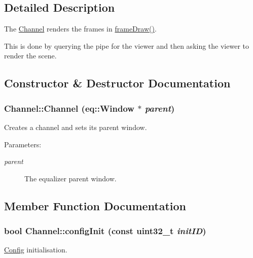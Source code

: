 \subsection{Detailed Description}
The \hyperlink{a00002}{Channel} renders the frames in \hyperlink{a00002_70cfd22742da9b9aa3e3478f356ba220}{frameDraw()}. 

This is done by querying the pipe for the viewer and then asking the viewer to render the scene. 

\subsection{Constructor \& Destructor Documentation}
\hypertarget{a00002_332b524bf3dd36fb43ff699fb8b64052}{
\subsubsection[{Channel}]{\setlength{\rightskip}{0pt plus 5cm}Channel::Channel (eq::Window $\ast$ {\em parent})}}
\label{a00002_332b524bf3dd36fb43ff699fb8b64052}


Creates a channel and sets its parent window. 

\begin{Desc}
\item[Parameters:]
\begin{description}
\item[{\em parent}]The equalizer parent window. \end{description}
\end{Desc}


\subsection{Member Function Documentation}
\hypertarget{a00002_15ff8d6c9962d86d886dba9485082dde}{
\subsubsection[{configInit}]{\setlength{\rightskip}{0pt plus 5cm}bool Channel::configInit (const uint32\_\-t {\em initID})}}
\label{a00002_15ff8d6c9962d86d886dba9485082dde}


\hyperlink{a00003}{Config} initialisation. 

